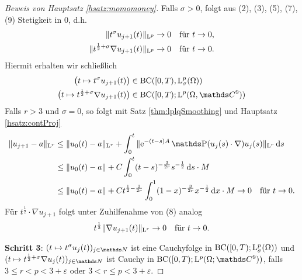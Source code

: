 \begin{proof}[Beweis von Hauptsatz \ref{hsatz:momomoney}]
  Falls $\sigma > 0$, folgt aus (2), (3), (5), (7), (9) Stetigkeit in $0$, d.h.
  \begin{align*}
    \|t^\sigma u_{j + 1}(t) \|_{\mathrm{L}^p} \to 0 &\quad\text{für } t \to 0, \\
    \|t^{\frac{1}{2} + \sigma} \nabla u_{j + 1}(t) \|_{\mathrm{L}^p} \to 0 &\quad\text{für } t\to 0.
  \end{align*}
  Hiermit erhalten wir schließlich
  \begin{align*}
    \big( t \mapsto t^\sigma u_{j + 1}(t) \big) &\in \mathrm{BC}([0,T), \Ell_\sigma^p(\Omega)) \\
    \big( t \mapsto t^{\frac{1}{2} + \sigma} \nabla u_{j + 1}(t) \big) &\in \mathrm{BC}([0,T); \Ell^p(\Omega,\C^9))
  \end{align*}
  Falls $r > 3$ und $\sigma = 0$, so folgt mit Satz \ref{thm:lplqSmoothing} und Hauptsatz \ref{hsatz:contProj}
  \begin{align*}
    \|u_{j + 1} - a \|_{\Ell^r}
    &\leq \|u_0(t) - a\|_{\Ell^r} + \int_0^t \|\e^{-(t - s) A} \PP(u_j(s) \cdot \nabla) u_j(s) \|_{\Ell^r} \d s \\
    &\leq \|u_0(t) - a \| + C \int_0^t (t - s)^{-\frac{3}{2r}} s^{-\frac{1}{2}} \d s \cdot M \\
    &\leq \|u_0(t) - a \| + C t^{\frac{1}{2} - \frac{3}{2r}} \int_0^1 (1 - x)^{-\frac{3}{2r}} x^{-\frac{1}{2}} \d x \cdot M \to 0 \quad\text{für } t \to 0.
  \end{align*}
  Für $t^\frac{1}{2} \cdot \nabla u_{j + 1}$ folgt unter Zuhilfenahme von (8) analog
  $$
  t^{\frac{1}{2}} \|\nabla u_{j + 1}(t) \|_{\mathrm{L}^r} \to 0 \quad\text{für } t \to 0.
  $$

  \textbf{Schritt 3}: $(t \mapsto t^\sigma u_j(t))_{j \in \N}$ ist eine Cauchyfolge in $\mathrm{BC}([0,T); \mathrm{L}^p_\sigma(\Omega))$ und $(t \mapsto t^{\frac{1}{2} + \sigma} \nabla u_j(t))_{j \in \N}$ ist Cauchy in $\mathrm{BC}([0,T); \Ell^p(\Omega; \C^9))$, falls $3 \leq r < p < 3 + \varepsilon$ oder $3 < r \leq p < 3 + \varepsilon$.


\end{proof}
